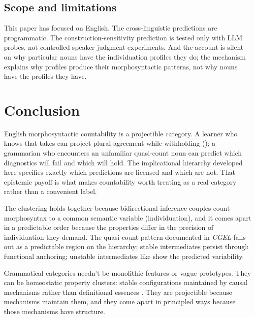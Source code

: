 \documentclass[12pt,a4paper]{article}
\begin{document}
\subsection{Scope and limitations}

This paper has focused on English. The cross-linguistic predictions are programmatic. The  construction-sensitivity prediction is tested only with LLM probes, not controlled speaker-judgment experiments. And the account is silent on why particular nouns have the individuation profiles they do; the mechanism explains why profiles produce their morphosyntactic patterns, not why nouns have the profiles they have.

\section{Conclusion}\label{sec:conclusion}

English morphosyntactic countability is a projectible category. A learner who knows that  takes  can project plural agreement while withholding (); a grammarian who encounters an unfamiliar quasi-count noun can predict which diagnostics will fail and which will hold. The implicational hierarchy developed here specifies exactly which predictions are licensed and which are not. That epistemic payoff is what makes countability worth treating as a real category rather than a convenient label.

The clustering holds together because bidirectional inference couples count morphosyntax to a common semantic variable (individuation), and it comes apart in a predictable order because the properties differ in the precision of individuation they demand. The quasi-count pattern documented in \textit{CGEL} falls out as a predictable region on the hierarchy; stable intermediates persist through functional anchoring; unstable intermediates like  show the predicted variability.

Grammatical categories needn't be monolithic features or vague prototypes. They can be homeostatic property clusters: stable configurations maintained by causal mechanisms rather than definitional essences \citep{reynolds2025stack,reynolds2025definiteness}. They are projectible because mechanisms maintain them, and they come apart in principled ways because those mechanisms have structure.
\end{document}
